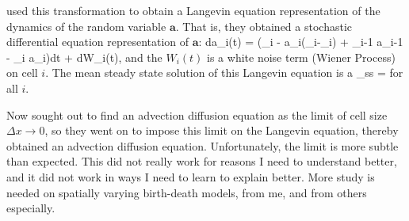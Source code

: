 \citet{Ancey2014, Ancey2015} used this transformation to obtain a Langevin equation representation of the dynamics of the random variable $\textbf{a}$.
That is, they obtained a stochastic differential equation representation of $\textbf{a}$: 
\be da_i(t) = (\lambda_i - a_i(\sigma_i-\mu_i) + \nu_{i-1} a_{i-1} - \nu_i a_i)dt + dW_i(t),\ee
and the $W_i(t)$ is a white noise term (Wiener Process) on cell $i$. 
The mean steady state solution of this Langevin equation is 
\be \bra a \ket_ss = \frac{\lambda}{\sigma-\mu} \ee 
for all $i$. 

Now \citet{Ancey2014,Ancey2015} sought out to find an advection diffusion equation as the limit of cell size $\Delta x \rightarrow 0$, so they went on to impose this limit on the Langevin equation, thereby obtained an advection diffusion equation. 
Unfortunately, the limit is more subtle than expected. 
This did not really work for reasons I need to understand better, and it did not work in ways I need to learn to explain better. 
More study is needed on spatially varying birth-death models, from me, and from others especially.



